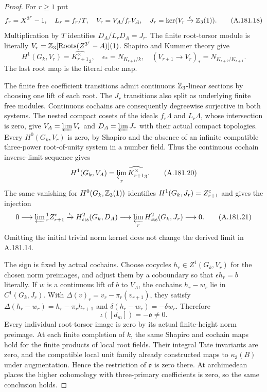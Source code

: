\begin{proof}
For \(r\ge1\) put
\[
 f_r=X^{3^r}-1,\quad L_r=f_r/T,\quad
 V_r=V_A/f_rV_A,\quad
 J_r=\ker(V_r\xrightarrow{\epsilon}\mathbb Z_3(1)).
\tag{A.181.18}
\]
Multiplication by \(T\) identifies
\(D_A/L_rD_A=J_r\).  The finite root-torsor module
is literally
\(V_r=\mathbb Z_3[\operatorname{Roots}(Z^{3^r}-A)](1)\).
Shapiro and Kummer theory give
\[
 H^1(G_k,V_r)=\widehat{K_{r+1}^\times}_3,
 \quad \epsilon_*=N_{K_{r+1}/k},\quad
 (V_{r+1}\to V_r)_*=N_{K_{r+2}/K_{r+1}}.
\tag{A.181.19}
\]
The last root map is the literal cube map.

The finite free coefficient transitions admit continuous
\(\mathbb Z_3\)-linear sections by choosing one lift of each
root.  The \(J_r\) transitions also split as underlying
finite free modules.  Continuous cochains are consequently
degreewise surjective in both systems.
The nested compact cosets of the ideals \(f_r\Lambda\)
and \(L_r\Lambda\), whose intersection is zero, give
\(V_A=\varprojlim V_r\) and \(D_A=\varprojlim J_r\)
with their actual compact topologies.
Every \(H^0(G_k,V_r)\) is zero, by Shapiro and the
absence of an infinite compatible three-power root-of-unity
system in a number field.  Thus the continuous cochain
inverse-limit sequence gives
\[
 H^1(G_k,V_A)=\varprojlim_r
                 \widehat{K_{r+1}^\times}_3.
\tag{A.181.20}
\]
The same vanishing for \(H^0(G_k,\mathbb Z_3(1))\) identifies
\(H^1(G_k,J_r)=Z_{r+1}^{\rm c}\) and gives the injection
\[
 0\longrightarrow\varprojlim{}^1_r Z_{r+1}^{\rm c}
      \xrightarrow{\iota}H^2_{\rm cts}(G_k,D_A)
      \longrightarrow\varprojlim_rH^2_{\rm cts}(G_k,J_r)
      \longrightarrow0.
\tag{A.181.21}
\]
Omitting the initial trivial norm kernel does not change
the derived limit in A.181.14.

The sign is fixed by actual cochains.  Choose cocycles
\(h_r\in Z^1(G_k,V_r)\) for the chosen norm preimages,
and adjust them by a coboundary so that
\(\epsilon h_r=b\) literally.  If \(w\) is a continuous
lift of \(b\) to \(V_A\), the cochains
\(h_r-w_r\) lie in \(C^1(G_k,J_r)\).  With
\(\Delta(v)_r=v_r-\pi_r(v_{r+1})\), they satisfy
\(\Delta(h_r-w_r)=h_r-\pi_rh_{r+1}\) and
\(\delta(h_r-w_r)=-\delta w_r\).  Therefore
\[
                 \iota([d_m])=-\mathfrak o\ne0.
\tag{A.181.22}
\]
Every individual root-torsor image is zero by its actual
finite-height norm preimage.  At each finite completion of
\(k\), the same Shapiro and cochain maps hold for the
finite products of local root fields.  Their integral
Tate invariants are zero, and the compatible local unit
family already constructed maps to \(\kappa_3(B)\)
under augmentation.  Hence the restriction of
\(\mathfrak o\) is zero there.  At archimedean places
the higher cohomology with three-primary coefficients is
zero, so the same conclusion holds.


\end{proof}
